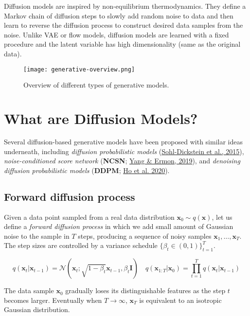 \documentclass[12pt]{article}
\begin{document}
Diffusion models are inspired by non-equilibrium thermodynamics. They define a Markov chain of diffusion steps to slowly add random noise to data and then learn to reverse the diffusion process to construct desired data samples from the noise. Unlike VAE or flow models, diffusion models are learned with a fixed procedure and the latent variable has high dimensionality (same as the original data).

\begin{figure}[H]
    \centering
    \texttt{[image: generative-overview.png]}
    \caption{Overview of different types of generative models.}
\end{figure}

\section{What are Diffusion Models?}

Several diffusion-based generative models have been proposed with similar ideas underneath, including \emph{diffusion probabilistic models} (\href{https://arxiv.org/abs/1503.03585}{Sohl-Dickstein et al., 2015}), \emph{noise-conditioned score network} (\textbf{NCSN}; \href{https://arxiv.org/abs/1907.05600}{Yang \& Ermon, 2019}), and \emph{denoising diffusion probabilistic models} (\textbf{DDPM}; \href{https://arxiv.org/abs/2006.11239}{Ho et al. 2020}).

\subsection{Forward diffusion process}

Given a data point sampled from a real data distribution $\mathbf{x}_0 \sim q(\mathbf{x})$, let us define a \emph{forward diffusion process} in which we add small amount of Gaussian noise to the sample in $T$ steps, producing a sequence of noisy samples $\mathbf{x}_1, \dots, \mathbf{x}_T$. The step sizes are controlled by a variance schedule $\{\beta_t \in (0, 1)\}_{t=1}^T$.

\[
q(\mathbf{x}_t \vert \mathbf{x}_{t-1}) = \mathcal{N}(\mathbf{x}_t; \sqrt{1 - \beta_t} \mathbf{x}_{t-1}, \beta_t\mathbf{I}) \quad
q(\mathbf{x}_{1:T} \vert \mathbf{x}_0) = \prod^T_{t=1} q(\mathbf{x}_t \vert \mathbf{x}_{t-1})
\]

The data sample $\mathbf{x}_0$ gradually loses its distinguishable features as the step $t$ becomes larger. Eventually when $T \to \infty$, $\mathbf{x}_T$ is equivalent to an isotropic Gaussian distribution.
\end{document}
